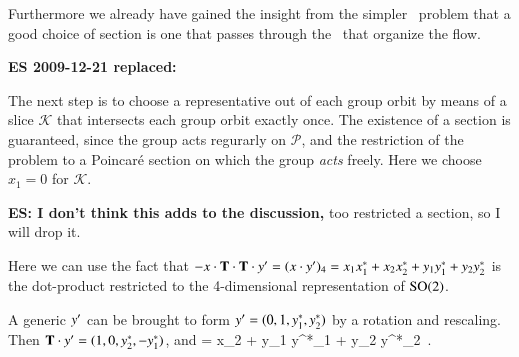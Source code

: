 Furthermore we already have gained the insight from
the simpler \Le\ problem that a good choice of section is one
that passes through the \eqva\ that organize the flow. 

{\bf ES 2009-12-21 replaced:}

The next step is to choose a representative out of each group
orbit by means of a slice $\mathcal{K}$ that
intersects each group orbit exactly once. The existence of a
section is guaranteed, since the group acts regurarly on $\mathcal{P}$, and the
restriction of the problem to a Poincar\'e section on which the
group \emph{acts} freely. Here we choose $x_1=0$ for
$\mathcal{K}$.

{\bf ES: I don't think this adds to the discussion,} too restricted a section,
so I will drop it.

Here we can use the fact that
$- x \cdot \mathbf{T}\cdot\mathbf{T} \cdot {\ensuremath{y'}}
 = (x \cdot {\ensuremath{y'}} )_4 =
    x_1 x_1^{*}
   +x_2 x_2^{*}
   +y_1 y_1^{*}
   +y_2 y_2^{*}
$
is the dot-product restricted to the 4-dimensional
representation of $\textrm{SO}(2)$.

A generic  $ {y'} $ can be brought to form $ {y'}  =
(0,1,y_1^{*},y_2^{*})$ by a rotation and rescaling. Then $\mathbf{T}
\cdot {\ensuremath{y'}}   = (1,0,y_2^{*},-y_1^{*})$, and
\beq
{} =
     {x_2 + y_1 y^{*}_1 + y_2 y^{*}_2}
\,.
\label{PCsectSin}
\eeq
